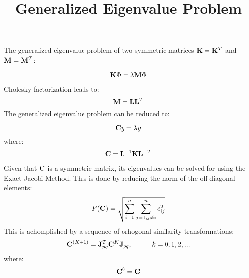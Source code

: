 \documentclass[11pt,letterpaper,twocolumn]{article}
\title{Generalized Eigenvalue Problem}
\date{}
\begin{document}
\maketitle

\noindent The generalized eigenvalue problem of two symmetric matrices  ${\bf K}={\bf K}^T$ and ${\bf M}={\bf M}^T$:

\begin{equation}
{\bf K}\Phi=\lambda{\bf M}\Phi
\end{equation}

\noindent Cholesky factorization leads to: 
\begin{equation}
{\bf M} = {\bf L}{\bf L}^T
\end{equation}
The  generalized eigenvalue problem can be reduced to:

\begin{equation}
{\bf C}y = \lambda y
\end{equation}
\noindent where: 
\begin{equation}
{\bf C} ={\bf L}^{-1} {\bf K} {\bf L}^{-T}
\end{equation}

Given that ${\bf C}$ is a symmetric matrix, its eigenvalues can be solved for using the Exact Jacobi Method. This is done by reducing the norm of the off diagonal elements:
\begin{equation}
F({\bf C}) = \sqrt{\sum_{i=1}^{n}\sum_{j=1,j \ne i}^{n}c_{ij}^2 }
\end{equation}
\noindent This is achomplished by a sequence of orhogonal similarity transformations:
\begin{equation}
{\bf C}^{(K+1)} = {\bf J}^T_{pq}{\bf C}^K{\bf J}_{pq}, \hspace{1cm} k=0,1,2,...
\end{equation}
\noindent where:
\begin{equation}
{\bf C}^{0} = {\bf C}
\end{equation}
\end{document}
